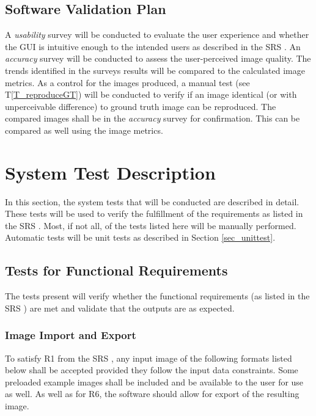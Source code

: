 \documentclass[12pt, titlepage]{article}
\newcommand{\tref}[1]{T\ref{#1}}
\begin{document}
\subsection{Software Validation Plan}
A \textit{usability} survey will be conducted to evaluate the user experience and whether 
the GUI is intuitive enough to the intended users as described in the SRS \citep{SRS}.
An \textit{accuracy} survey will be conducted to assess the user-perceived image quality. 
The trends identified in the surveys results will be compared to the calculated image metrics.
As a control for the images produced, a manual test (see \tref{T_reproduceGT})
will be conducted to verify if 
an image identical (or with unperceivable difference) to ground truth image can be reproduced.
The compared images shall be in the \textit{accuracy} survey for confirmation. This can be compared
as well using the image metrics. 


\section{System Test Description} \label{sec_systest_desc}

In this section, the system tests that will be conducted are described in detail. These tests
will be used to verify the fulfillment of the requirements as listed in the SRS \citep{SRS}.
Most, if not all, of the tests listed here will be manually performed. Automatic
tests will be unit tests as described in Section \ref{sec_unittest}.

\subsection{Tests for Functional Requirements}

The tests present will verify whether the functional requirements 
(as listed in the SRS \cite{SRS}) are met and validate that the outputs
are as expected.

\subsubsection{Image Import and Export} \label{subsec_img_io}

To satisfy R1 from the SRS \citep{SRS}, any input image of the following formats listed below shall be 
accepted provided they follow the input data constraints.
Some preloaded example images shall be included and be available to the user for use as well.
As well as for R6, the software should allow for export of the resulting image.
\end{document}
